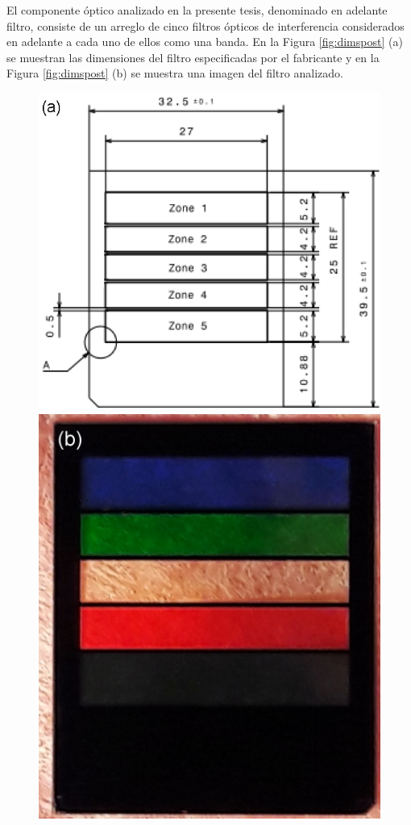 \hspace{0.5cm}El componente óptico analizado en la presente tesis, denominado en adelante filtro, consiste de un arreglo de cinco filtros ópticos de interferencia  considerados en adelante a cada uno de ellos como una banda. En la Figura \ref{fig:dimspost} (a) se muestran las dimensiones del filtro especificadas por el fabricante y en la Figura \ref{fig:dimspost} (b) se muestra una imagen del filtro analizado.
\begin{figure}
\centering
\includegraphics[scale=0.8]{Figs/cuantificaciondefectos/dimsfiltro.png}\hfill
\includegraphics[scale=0.15]{Figs/cuantificaciondefectos/filtro_real.jpg}

\end{figure}
